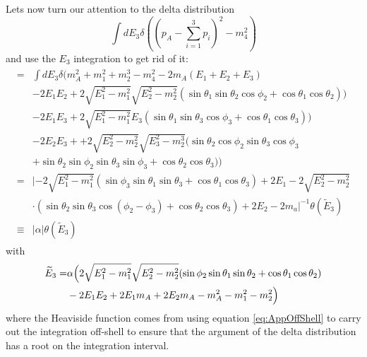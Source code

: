 Lets now turn our attention to the delta distribution 
\begin{equation}
\int dE_3 \delta\left(\left(p_A-\sum_{i=1}^3p_i\right)^2-m_4^2\right)
\end{equation}
and use the $E_3$ integration to get rid of it:
\begin{align}
\begin{split}
=&\int dE_3 \delta(m_A^2+m_1^2+m_2^3-m_4^2-2m_A(E_1+E_2+E_3)\\
&-2E_1E_2+2\sqrt{E_1^2-m_1^2}\sqrt{E_2^2-m_2^2}(\sin\theta_1\sin\theta_2\cos\phi_2+\cos\theta_1\cos\theta_2))\\
&-2E_1E_3+2\sqrt{E_1^2-m_1^2}E_3(\sin\theta_1\sin\theta_3\cos\phi_3+\cos\theta_1\cos\theta_3))\\
&-2E_2E_3++2\sqrt{E_2^2-m_2^2}\sqrt{E_3^2-m_2^3}(\sin\theta_2\cos\phi_2\sin\theta_3\cos\phi_3\\
&+\sin\theta_2\sin\phi_2\sin\theta_3\sin\phi_3+\cos\theta_2\cos\theta_3))\\
=&\lvert-2\sqrt{E_1^2-m_1^2}(\sin\phi_3\sin\theta_1\sin\theta_3+\cos\theta_1\cos\theta_3)+2E_1-2\sqrt{E_2^2-m_2^2}\\&\cdot(\sin\theta_2\sin\theta_3\cos(\phi_2-\phi_3)+\cos\theta_2\cos\theta_3)+2E_2-2m_a\rvert^{-1}\theta(\widetilde{E}_3)\\
\equiv&|\alpha|\theta(\widetilde{E}_3)
\end{split}
\end{align}
with
\begin{align*}
\widetilde{E}_3=&\alpha\Bigl{(}2\sqrt{E_1^2-m_1^2}\sqrt{E_2^2-m_2^2}(\sin\phi_2\sin\theta_1\sin\theta_2+\cos\theta_1\cos\theta_2)\\&-2E_1E_2+2E_1m_A+2E_2m_A-m_A^2-m_1^2-m_2^2\Bigr{)}
\end{align*}
where the Heaviside function comes from using equation \ref{eq:AppOffShell} to carry out the integration off-shell to ensure that the argument of the delta distribution has a root on the integration interval.

